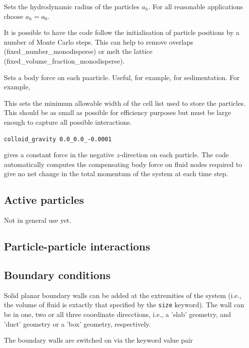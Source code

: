 
Sets the hydrodynamic radius of the particles $a_h$. For all
reasonable applications choose $a_h = a_0$.


It is possible to have the code follow the initialisation of
particle positions by a number of Monte Carlo steps. This can
help to remove overlaps (fixed\_number\_monodisperse) or
melt the lattice (fixed\_volume\_fraction\_monodisperse).


Sets a body force on each paarticle. Useful, for example, for
sedimentation. For example,


This sets the minimum allowable width of the cell list used to
store the particles. This should be as small as possible for
efficiency purposes but must be large enough to capture all
possible interactions.

\texttt{colloid\_gravity  0.0\_0.0\_-0.0001}

gives a constant force in the negative $z$-direction on each particle.
The code automatically computes the compensating body force on fluid nodes
required to give no net change in the total momentum of the system at
each time step.

\subsection{Active particles}

Not in general use yet.


\subsection{Particle-particle interactions}


\subsection{Boundary conditions}

Solid planar boundary walls can be added at the extremities of the
system (i.e., the volume of fluid is extactly that specified by
the \texttt{size} keyword). The wall can be in one, two or all three
coordinate direcctions, i.e., a 'slab' geometry, and 'duct' geometry
or a 'box' geometry, respectively.

The boundary walls are switched on via the keyword value pair

